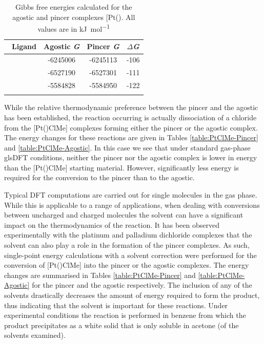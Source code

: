 \begin{table}[htp]
\caption[Gibbs free energies calculated for agostic and pincer [Pt(\tBuxantphos)\ce{Me{]}+}]{Gibbs free energies calculated for the agostic and pincer complexes [Pt(\tBuxantphosk)\ce{Me]+}.  All values are in \si{\kilo\joule\per\mole}}
\vspace{1em}
\label{table:PtMeenergies}
\small
\begin{center}
\begin{tabular}{l c c c}
	\toprule
	~\bfseries{Ligand} & \bfseries{Agostic \emph{G}} & \bfseries{Pincer \emph{G}} & \bfseries{$\Delta$\emph{G}} \\
	\midrule		
	~\tBuSixantphos	& -6245006	& -6245113 	& -106 \\
	~\tBuThixantphos	& -6527190	& -6527301	& -111 \\
	~\tBuXantphos		& -5584828	& -5584950	& -122 \\ 
	\bottomrule{}
\end{tabular}
\end{center}
\end{table}

While the relative thermodynamic preference between the pincer and the agostic has been established, the reaction occurring is actually dissociation of a chloride from the [Pt(\tBuxantphos)ClMe] complexes forming either the pincer or the agostic complex.  The energy changes for these reactions are given in Tables \ref{table:PtClMe-Pincer} and \ref{table:PtClMe-Agostic}.  In this case we see that under standard gas-phase gls{DFT} conditions, neither the pincer nor the agostic complex is lower in energy than the [Pt(\tBuxantphos)ClMe] starting material.  However, significantly less energy is required for the conversion to the pincer than to the agostic.  

Typical DFT computations are carried out for single molecules in the gas phase.  While this is applicable to a range of applications, when dealing with conversions between uncharged and charged molecules the solvent can have a significant impact on the thermodynamics of the reaction.  It has been observed experimentally with the platinum and palladium dichloride complexes that the solvent can also play a role in the formation of the pincer complexes.  As such, single-point energy calculations with a solvent correction were performed for the conversion of [Pt(\tBuxantphos)ClMe] into the pincer or the agostic complexes.  The energy changes are summarised in Tables \ref{table:PtClMe-Pincer} and \ref{table:PtClMe-Agostic} for the pincer and the agostic respectively.  The inclusion of any of the solvents drastically decreases the amount of energy required to form the product, thus indicating that the solvent is important for these reactions.  Under experimental conditions the reaction is performed in benzene from which the product precipitates as a white solid that is only soluble in acetone (of the solvents examined).  

